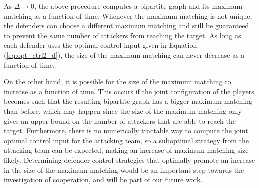 As $\Delta\rightarrow 0$, the above procedure computes a bipartite graph and its maximum matching as a function of time. Whenever the maximum matching is not unique, the defenders can choose a different maximum matching and still be guaranteed to prevent the same number of attackers from reaching the target. As long as each defender uses the optimal control input given in Equation (\ref{eq:opt_ctrl2_d}), the size of the maximum matching can never decrease as a function of time. 

On the other hand, it is possible for the size of the maximum matching to increase as a function of time. This occurs if the joint configuration of the players becomes such that the resulting bipartite graph has a bigger maximum matching than before, which may happen since the size of the maximum matching only gives an upper bound on the number of attackers that are able to reach the target. Furthermore, there is no numerically tractable way to compute the joint optimal control input for the attacking team, so a suboptimal strategy from the attacking team can be expected, making an increase of maximum matching size likely. Determining defender control strategies that optimally promote an increase in the size of the maximum matching would be an important step towards the investigation of cooperation, and will be part of our future work.